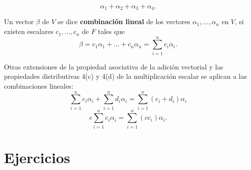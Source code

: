 $$\alpha_1+\alpha_2+\alpha_3+\alpha_4.$$

\begin{def.}
    Un vector $\beta$ de $V$ se dice \textbf{combinación lineal} de los vectores $\alpha_1,\ldots , \alpha_n$ en $V$, si existen escalares $c_1,\ldots , c_n$ de $F$ tales que
    $$\beta = c_1\alpha_1 + \ldots + c_n\alpha_n = \sum_{i=1}^n c_i\alpha_i.$$
\end{def.}

Otras extensiones de la propiedad asociativa de la adición vectorial y las propiedades distributivas 4(c) y 4(d) de la multiplicación escalar se aplican a las combinaciones lineales:
$$\sum_{i=1}^n c_i\alpha_i + \sum_{i=1}^n d_i\alpha_i=\sum_{i=1}^n (c_i+d_i)\alpha_i$$
$$c\sum_{i=1}^n c_i\alpha_i = \sum_{i=1}^n (cc_i)\alpha_i.$$

\section*{Ejercicios}

